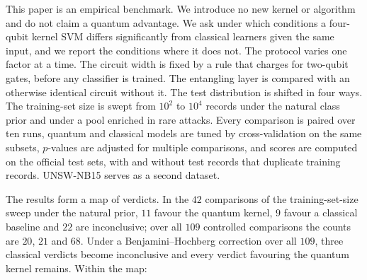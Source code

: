 This paper is an empirical benchmark. We introduce no new kernel or algorithm and do not claim
a quantum advantage. We ask under which conditions a four-qubit \ZZ{} kernel SVM differs
significantly from classical learners given the same input, and we report the conditions
where it does not. The protocol varies one factor at a time. The circuit width is fixed by a
rule that charges for two-qubit gates, before any classifier is trained. The entangling layer
is compared with an otherwise identical circuit without it. The test distribution is shifted
in four ways. The training-set size is swept from $10^2$ to $10^4$ records under the natural
class prior and under a pool enriched in rare attacks. Every comparison is paired over ten
runs, quantum and classical models are tuned by cross-validation on the same subsets, $p$-values are adjusted
for multiple comparisons, and scores are computed on the official test sets, with and without
test records that duplicate training records. UNSW-NB15 serves as a second dataset.

The results form a map of verdicts. In the $42$ comparisons of the training-set-size sweep
under the natural prior, $11$ favour the quantum kernel, $9$ favour a classical baseline and
$22$ are inconclusive; over all $109$ controlled comparisons the counts are $20$, $21$ and $68$.
Under a Benjamini--Hochberg correction over all $109$, three classical verdicts become
inconclusive and every verdict favouring the quantum kernel remains. Within the map:

